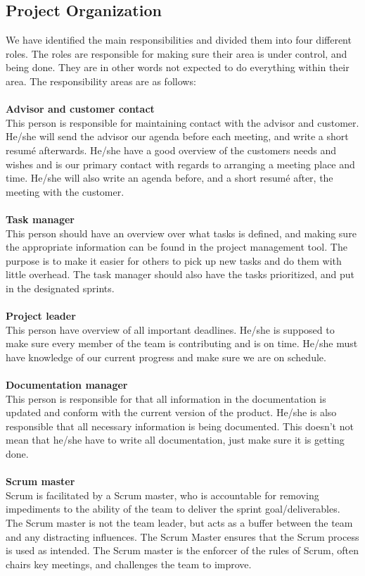 \documentclass{report}
\begin{document}
\subsection{Project Organization} \label{subsec:project_org}
We have identified the main responsibilities and divided them into four different roles. The roles are responsible for making sure their area is under control, and being done. They are in other words not expected to do everything within their area. The responsibility areas are as follows:
\\ \\
\textbf{Advisor and customer contact} \\
This person is responsible for maintaining contact with the advisor and customer. He/she will send the advisor our agenda before each meeting, and write a short resumé afterwards. He/she have a good overview of the customers needs and wishes and is our primary contact with regards to arranging a meeting place and time. He/she will also write an agenda before, and a short resumé after, the meeting with the customer.
\\ \\
\textbf{Task manager}\\
This person should have an overview over what tasks is defined, and making sure the appropriate information can be found in the project management tool. The purpose is to make it easier for others to pick up new tasks and do them with little overhead. The task manager should also have the tasks prioritized, and put in the designated sprints.\\ \\
\textbf{Project leader}\\
This person have overview of all important deadlines. He/she is supposed to make sure every member of the team is contributing and is on time. He/she must have knowledge of our current progress and make sure we are on schedule.
\\ \\
\textbf{Documentation manager}\\
This person is responsible for that all information in the documentation is updated and conform with the current version of the product. He/she is also responsible that all necessary information is being documented. This doesn’t not mean that he/she have to write all documentation, just make sure it is getting done.\\ \\
\textbf{Scrum master}\\
Scrum is facilitated by a Scrum master, who is accountable for removing impediments to the ability of the team to deliver the sprint goal/deliverables. The Scrum master is not the team leader, but acts as a buffer between the team and any distracting influences. The Scrum Master ensures that the Scrum process is used as intended. The Scrum master is the enforcer of the rules of Scrum, often chairs key meetings, and challenges the team to improve.\\ \\
\end{document}

